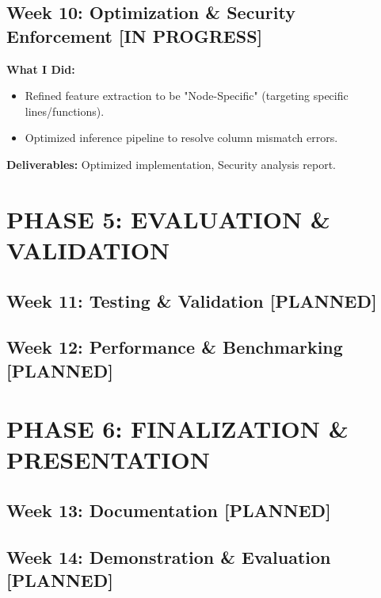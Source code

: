 \documentclass[11pt,a4paper]{article}
\newcommand{\status}[2]{\hfill \textcolor{#1}{\textbf{[#2]}}}
\begin{document}
\subsection*{Week 10: Optimization \& Security Enforcement \status{progcolor}{IN PROGRESS}}
\textbf{What I Did:}
\begin{itemize}[noitemsep]
    \item Refined feature extraction to be "Node-Specific" (targeting specific lines/functions).
    \item Optimized inference pipeline to resolve column mismatch errors.
\end{itemize}
\textbf{Deliverables:} Optimized implementation, Security analysis report.

\section*{PHASE 5: EVALUATION \& VALIDATION}

\subsection*{Week 11: Testing \& Validation \status{plancolor}{PLANNED}}
\subsection*{Week 12: Performance \& Benchmarking \status{plancolor}{PLANNED}}

\section*{PHASE 6: FINALIZATION \& PRESENTATION}

\subsection*{Week 13: Documentation \status{plancolor}{PLANNED}}
\subsection*{Week 14: Demonstration \& Evaluation \status{plancolor}{PLANNED}}
\end{document}
